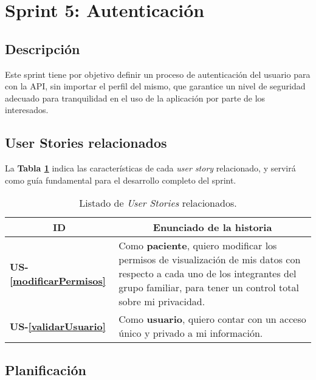 \section{Sprint 5: Autenticación}%

\subsection{Descripción}

Este sprint tiene por objetivo definir un proceso de autenticación del usuario para con la API, sin importar el perfil del mismo, que garantice un nivel de seguridad adecuado para tranquilidad en el uso de la aplicación por parte de los interesados. 

\subsection{User Stories relacionados}

La \textbf{Tabla \ref{US-Sprint5}} indica las características de cada \textit{user story} relacionado, y servirá como guía fundamental para el desarrollo completo del sprint.

\begin{comment}
como usuario quiero contar con un acceso único y privado a mi información. Agregaría este user story, habría que ver la traza con el documento de diseño para que queden balanceados.
\end{comment}

\begin{table}[h]
	\centering
	\begin{tabular}{|m{1.5cm}|m{11.5cm}|}
		\hline
		\multicolumn{1}{|c|}{\textbf{ID}} &
		\multicolumn{1}{c|}{\textbf{Enunciado de la historia}} \\          
		\hline
		\textbf{US-\ref{modificarPermisos}} & Como \textbf{paciente}, quiero modificar los permisos de visualización de mis datos con respecto a cada uno de los integrantes del grupo familiar, para tener un control total sobre mi privacidad. \\
		\hline 
		\textbf{US-\ref{validarUsuario} } & Como \textbf{usuario}, quiero contar con un acceso único y privado a mi información. \\
		\hline 
	\end{tabular}
	\caption{Listado de \textit{User Stories} relacionados.}
	\label{US-Sprint5}
\end{table}


\subsection{Planificación}

